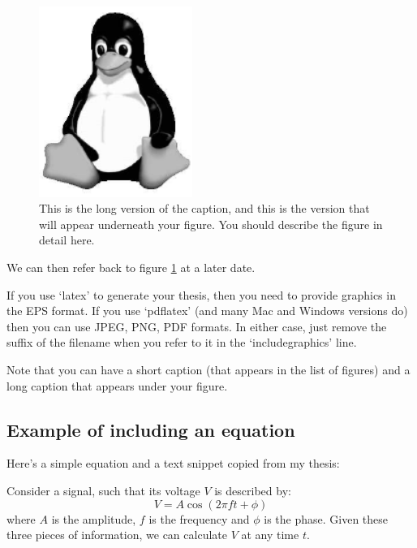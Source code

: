 \begin{figure}[tbp]
\centering
\includegraphics[width=5cm]{chapter1/figures/tux}

\caption[This is a short version of the caption that will appear in 
the List of Figures.]{This is the long version of the caption, and this
is the version that will appear underneath your figure. You should
describe the figure in detail here.}

\label{fig:bulk_diff_techniques}
\end{figure}

We can then refer back to figure \ref{fig:bulk_diff_techniques} at a later
date.

If you use `latex' to generate your thesis, then you need to provide
graphics in the EPS format. If you use `pdflatex' (and many Mac and Windows
versions do) then you can use JPEG, PNG, PDF formats. In either case, just
remove the suffix of the filename when you refer to it in the
`includegraphics' line.

Note that you can have a short caption (that appears in the list of figures)
and a long caption that appears under your figure.

		\subsection{Example of including an equation}

Here's a simple equation and a text snippet copied from my thesis:

Consider a signal, such that its voltage $V$ is described by:
\begin{equation}
V = A \cos (2 \pi f t + \phi)
\label{eq:simp_sig}
\end{equation}
\noindent
where $A$ is the amplitude, $f$ is the frequency and $\phi$ is the
phase. Given these three pieces of information, we can calculate $V$ at
any time $t$.

